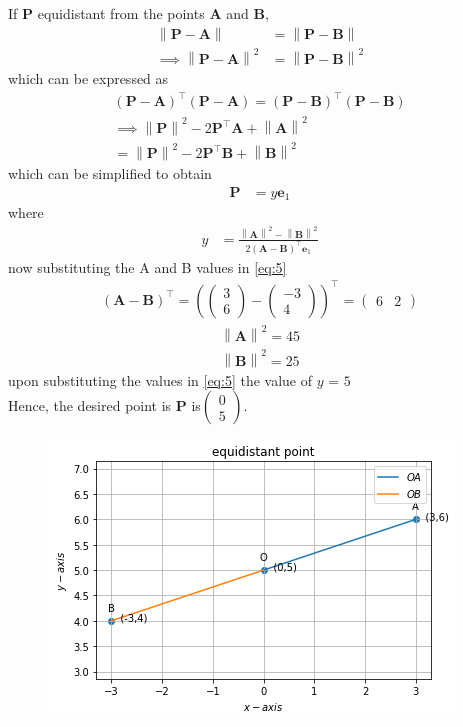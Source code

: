 \documentclass[12pt]{article}
\providecommand{\brak}[1]{\ensuremath{\left(#1\right)}}
\providecommand{\norm}[1]{\left\lVert#1\right\rVert}
\newcommand{\myvec}[1]{\ensuremath{\begin{pmatrix}#1\end{pmatrix}}}
\let\vec\mathbf
\begin{document}
\begin{enumerate}
  If $\vec{P}$ equidistant from the points $\vec{A}$ and $\vec{B}$, 
\begin{align}
 \norm{\vec{P}-\vec{A}} &=
\norm{\vec{P}-\vec{B}} 
\\
 \implies \norm{\vec{P}-\vec{A}}^2 &=
\norm{\vec{P}-\vec{B}}^2 
\end{align}
which can be expressed as 
\begin{align}
 \brak{\vec{P}-\vec{A}}^{\top} \brak{\vec{P}-\vec{A}}=
 \brak{\vec{P}-\vec{B}}^{\top} 
\brak{\vec{P}-\vec{B}}
\\
 \implies \norm{\vec{P}}^2-2{\vec{P}}^{\top}\vec{A} + \norm{\vec{A}}^2
 \\= \norm{\vec{P}}^2-2{\vec{P}}^{\top}\vec{B} + \norm{\vec{B}}^2
\end{align}
which can be simplified to obtain
  \begin{align}
   \vec{P} &=
    y\vec{e}_1
  \end{align}
  where 
  \begin{align}
   y &=\frac{\norm{\vec{A}}^2 -\norm{\vec{B}}^2 }{2\brak{\vec{A}-\vec{B}}^{\top }\vec{e}_1
}\label{eq:5}  
  \end{align}
  now substituting the A and B values in \eqref{eq:5}
\begin{align}
 \brak{\vec{A}-\vec{B}}^{\top}=
 \brak{\myvec{3 \\ 6}-\myvec{-3\\4}}^{\top}
 =\myvec{6 & 2}
\end{align}
  \begin{align}
   \norm{\vec{A}}^2 = 45
    \end{align}
 \begin{align}
   \norm{\vec{B}}^2 = 25
    \end{align}
upon   substituting the values in \eqref{eq:5} the value of $y$ = $ 5$
\\Hence, the desired point is $\vec{P}$ is$\myvec{ 0 \\ 5}$.\\

\begin{figure}[!h]
 \begin{center}
  \includegraphics[width=\columnwidth]{./figs/fig.png}
 \end{center}
\caption{}
\label{fig:Fig1}
\end{figure}
\end{enumerate}
\end{document}

